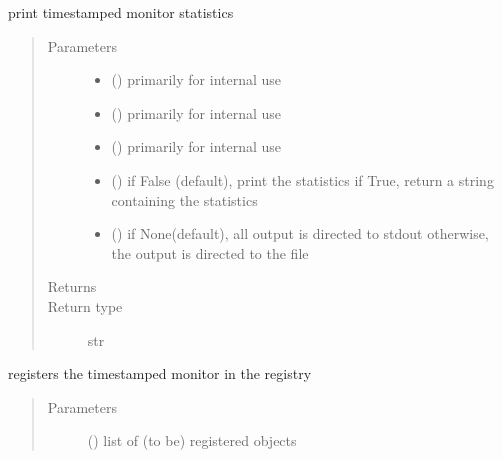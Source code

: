 \documentclass[letterpaper,10pt,english]{sphinxmanual}
\begin{document}
\begin{fulllineitems}
\begin{fulllineitems}
\label{\detokenize{Reference:salabim.MonitorTimestamp.print_statistics}}
print timestamped monitor statistics
\begin{quote}\begin{description}
\item[{Parameters}] \leavevmode\begin{itemize}
\item {} 
 () \textendash{} primarily for internal use

\item {} 
 () \textendash{} primarily for internal use

\item {} 
 () \textendash{} primarily for internal use

\item {} 
 () \textendash{} if False (default), print the statistics
if True, return a string containing the statistics

\item {} 
 () \textendash{} if None(default), all output is directed to stdout 
otherwise, the output is directed to the file

\end{itemize}

\item[{Returns}] \leavevmode
{}

\item[{Return type}] \leavevmode
str

\end{description}\end{quote}

\end{fulllineitems}


\begin{fulllineitems}
\label{\detokenize{Reference:salabim.MonitorTimestamp.register}}
registers the timestamped monitor in the registry
\begin{quote}\begin{description}
\item[{Parameters}] \leavevmode
{} () \textendash{} list of (to be) registered objects


\end{description}
\end{quote}
\end{fulllineitems}
\end{fulllineitems}
\end{document}
